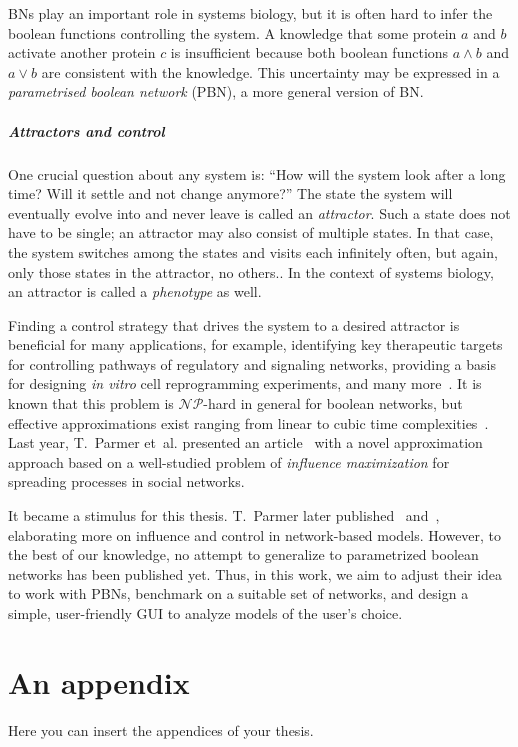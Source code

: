 \documentclass[
	digital, oneside, nosansbold, nocolorbold, nolot, nolof
]{fithesis4}
\begin{document}
BNs play an important role in systems biology, but it is often hard to infer
the boolean functions controlling the system. A knowledge that some protein
\(a\) and \(b\) activate another protein \(c\) is insufficient because both
boolean functions \(a \land b\) and \(a \lor b\) are consistent with the
knowledge. This uncertainty may be expressed in a \emph{parametrised boolean
network} (PBN), a more general version of BN.

\paragraph{Attractors and control}

One crucial question about any system is: \enquote{How will the system look
after a long time? Will it settle and not change anymore?} The state the system
will eventually evolve into and never leave is called an \emph{attractor}. Such
a state does not have to be single; an attractor may also consist of multiple
states. In that case, the system switches among the states and visits each
infinitely often, but again, only those states in the attractor, no others.. In
the context of systems biology, an attractor is called a \emph{phenotype} as
well.

Finding a control strategy that drives the system to a desired attractor is
beneficial for many applications, for example, identifying key therapeutic
targets for controlling pathways of regulatory and signaling networks,
providing a basis for designing \emph{in vitro} cell reprogramming experiments,
and many more~\cite{control_psbn}. It is known that this problem is
\(\mathcal{NP}\)-hard in general for boolean networks, but effective
approximations exist ranging from linear to cubic time
complexities~\cite{control_akutsu}. Last year, T.~Parmer et~al. presented an
article~\cite{infl_max_BN} with a novel approximation approach based on a
well-studied problem of \emph{influence maximization} for spreading processes
in social networks.

It became a stimulus for this thesis. T.~Parmer later published
\cite{parmer_dynamical}~and~\cite{parmer_phd}, elaborating more on influence
and control in network-based models. However, to the best of our knowledge, no
attempt to generalize to parametrized boolean networks has been published yet.
Thus, in this work, we aim to adjust their idea to work with PBNs, benchmark on
a suitable set of networks, and design a simple, user-friendly GUI to analyze
models of the user's choice.


\appendix
\chapter{An appendix}
Here you can insert the appendices of your thesis.
\end{document}
